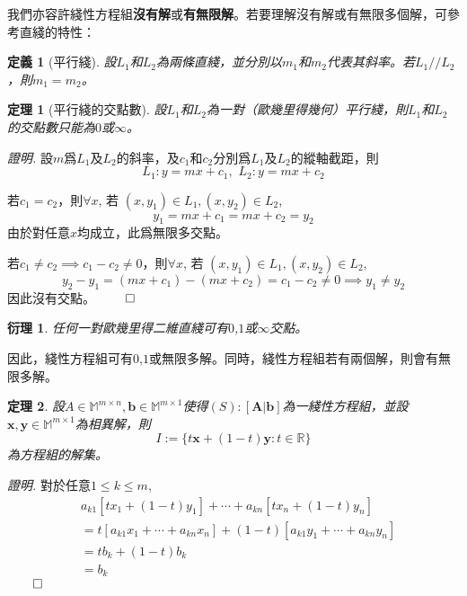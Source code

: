 \documentclass[12pt]{article}
\newtheorem{definition}{定義}
\newtheorem*{theorem}{定理}
\newtheorem*{corollary}{衍理}
\renewenvironment*{proof}{\textit{證明.}}{\hfill$\qed$}
\begin{document}
    我們亦容許綫性方程組\textbf{沒有解}或\textbf{有無限解}。若要理解沒有解或有無限多個解，可參考直綫的特性：

    \begin{definition}[平行綫]
        設$L_1$和$L_2$為兩條直綫，並分別以$m_1$和$m_2$代表其斜率。若$L_1//L_2$，則$m_1=m_2$。
    \end{definition}

    \begin{theorem}[平行綫的交點數]
        設$L_1$和$L_2$為一對（歐幾里得幾何）平行綫，則$L_1$和$L_2$的交點數只能為$0$或$\infty$。
    \end{theorem}
    
    \begin{proof}
        設$m$爲$L_1$及$L_2$的斜率，及$c_1$和$c_2$分別爲$L_1$及$L_2$的縱軸截距，則$$L_1:y=mx+c_1,\,\,L_2:y=mx+c_2$$

        若$c_1=c_2$，則$\forall x$, 若 $(x,y_1)\in L_1, (x,y_2)\in L_2$, $$y_1=mx+c_1=mx+c_2=y_2$$
        由於對任意$x$均成立，此爲無限多交點。

        若$c_1\neq c_2 \implies c_1-c_2\neq 0$，則$\forall x$, 若 $(x,y_1)\in L_1, (x,y_2)\in L_2$, $$y_2-y_1=(mx+c_1)-(mx+c_2)=c_1-c_2\neq 0 \implies y_1\neq y_2$$
        因此沒有交點。
    \end{proof}

    \begin{corollary}
        任何一對歐幾里得二維直綫可有$0$,$1$或$\infty$交點。
    \end{corollary}

    因此，綫性方程組可有$0$,$1$或無限多解。同時，綫性方程組若有兩個解，則會有無限多解。

    \begin{theorem}
        設$A\in\mathbb{M}^{m\times n}, \mathbf{b}\in\mathbb{M}^{m\times 1}$使得$(S):[\mathbf{A}|\mathbf{b}]$為一綫性方程組，並設$\mathbf{x},\mathbf{y}\in\mathbb{M}^{m\times 1}$為相異解，則$$I:=\{t\mathbf{x}+(1-t)\mathbf{y}:t\in\mathbb{R}\}$$為方程組的解集。
    \end{theorem}
    
    \begin{proof}
        對於任意$1\leq k\leq m$,\begin{align*}
            &a_{k1}[tx_1+(1-t)y_1]+\cdots+a_{kn}[tx_n+(1-t)y_n]\\
            &=t[a_{k1}x_1+\cdots+a_{kn}x_n]+(1-t)[a_{k1}y_1+\cdots+a_{kn}y_n]\\
            &=tb_k+(1-t)b_k\\
            &=b_k
        \end{align*}
    \end{proof}
\end{document}
